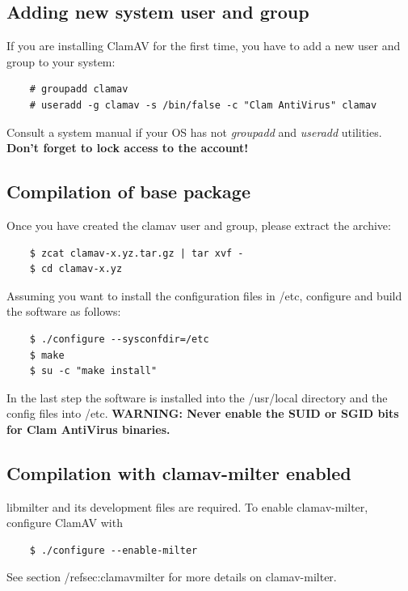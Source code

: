 \documentclass[a4paper,titlepage,12pt]{article}
\begin{document}
    \subsection{Adding new system user and group}
    If you are installing ClamAV for the first time, you have to add a new
    user and group to your system:
    \begin{verbatim}
	# groupadd clamav
	# useradd -g clamav -s /bin/false -c "Clam AntiVirus" clamav
    \end{verbatim}
    Consult a system manual if your OS has not \emph{groupadd} and
    \emph{useradd} utilities. \textbf{Don't forget to lock access to the
    account!}

    \subsection{Compilation of base package}
    Once you have created the clamav user and group, please extract the archive:
    \begin{verbatim}
	$ zcat clamav-x.yz.tar.gz | tar xvf -
	$ cd clamav-x.yz
    \end{verbatim}
    Assuming you want to install the configuration files in /etc, configure
    and build the software as follows:
    \begin{verbatim}
	$ ./configure --sysconfdir=/etc
	$ make
	$ su -c "make install"
    \end{verbatim}
    In the last step the software is installed into the /usr/local directory
    and the config files into /etc. \textbf{WARNING: Never enable the SUID
    or SGID bits for Clam AntiVirus binaries.}

    \subsection{Compilation with clamav-milter enabled}
    libmilter and its development files are required. To enable clamav-milter,
    configure ClamAV with
    \begin{verbatim}
	$ ./configure --enable-milter
    \end{verbatim}
    See section /ref{sec:clamavmilter} for more details on clamav-milter.
\end{document}
